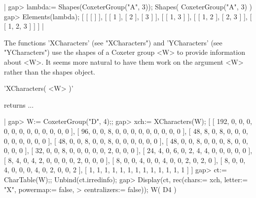 |    gap> lambda:= Shapes(CoxeterGroup("A", 3));
    Shapes( CoxeterGroup("A", 3) )
    gap> Elements(lambda);
    [ [ [  ] ], [ [ 1 ], [ 2 ], [ 3 ] ], [ [ 1, 3 ] ], 
      [ [ 1, 2 ], [ 2, 3 ] ], [ [ 1, 2, 3 ] ] ] |


The  functions 'XCharacters' (see  "XCharacters") and  'YCharacters' (see
"YCharacters")  use  the  shapes  of  a  Coxeter  group  <W>  to  provide
information about  <W>.  It seems more  natural to have them  work on the
argument <W> rather than the shapes object.


'XCharacters( <W> )'

returns  ...

    
    

|    gap> W:= CoxeterGroup("D", 4);;
    gap> xch:= XCharacters(W);                     
    [ [ 192, 0, 0, 0, 0, 0, 0, 0, 0, 0, 0, 0, 0 ], 
      [ 96, 0, 0, 8, 0, 0, 0, 0, 0, 0, 0, 0, 0 ], 
      [ 48, 8, 0, 8, 0, 0, 0, 0, 0, 0, 0, 0, 0 ], 
      [ 48, 0, 0, 8, 0, 0, 8, 0, 0, 0, 0, 0, 0 ], 
      [ 48, 0, 0, 8, 0, 0, 0, 8, 0, 0, 0, 0, 0 ], 
      [ 32, 0, 0, 8, 0, 0, 0, 0, 0, 2, 0, 0, 0 ], 
      [ 24, 4, 0, 6, 0, 2, 4, 4, 0, 0, 0, 0, 0 ], 
      [ 8, 4, 0, 4, 2, 0, 0, 0, 0, 2, 0, 0, 0 ], 
      [ 8, 0, 0, 4, 0, 0, 4, 0, 0, 2, 0, 2, 0 ], 
      [ 8, 0, 0, 4, 0, 0, 0, 4, 0, 2, 0, 0, 2 ], 
      [ 1, 1, 1, 1, 1, 1, 1, 1, 1, 1, 1, 1, 1 ] ]
    gap> ct:= CharTable(W);;  Unbind(ct.irredinfo);
    gap> Display(ct, rec(chars:= xch, letter:= "X", powermap:= false,        
    >                    centralizers:= false));
    W( D4 )
    

